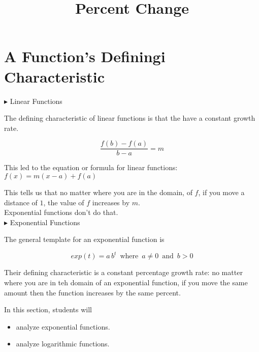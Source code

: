 \documentclass{ximera}
\title{Percent Change}
\begin{document}
\begin{abstract}
\end{abstract}
\maketitle




\section{A Function's Definingi Characteristic}




$\blacktriangleright$ Linear Functions

The defining characteristic of linear functions is that the have a constant growth rate.


\[   \frac{f(b)-f(a)}{b-a} = m       \]

This led to the equation or formula for linear functions:  $f(x) = m(x-a) + f(a)$


This tells us that no matter where you are in the domain, of $f$, if you move a distance of $1$, the value of $f$ increases by $m$. \\


Exponential functions don't do that. \\





$\blacktriangleright$ Exponential Functions



The general template for an exponential function is 

\[   exp(t) = a \, b^t   \, \text{ where } \,  a \ne 0  \, \text{ and } \,    b > 0   \]



Their defining characteristic is a constant percentage growth rate: no matter where you are in teh domain of an exponential function, if you move the same amount then the function increases by the same percent.








\begin{sectionOutcomes}
In this section, students will 

\begin{itemize}
\item analyze exponential functions.
\item analyze logarithmic functions.
\end{itemize}
\end{sectionOutcomes}
\end{document}
